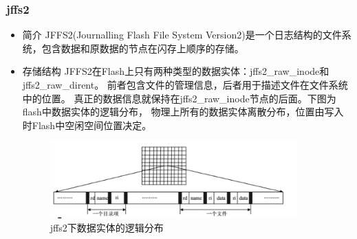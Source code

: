\documentclass[UTF8,a4paper]{ctexart}
\begin{document}
\subsubsection{jffs2}
\begin{itemize}
\item 简介
JFFS2(Journalling Flash File System Version2)是一个日志结构的文件系统，包含数据和原数据的节点在闪存上顺序的存储。
\item 存储结构
JFFS2在Flash上​​只有两种类型的数据实体：jffs2\_raw\_inode和jffs2\_raw\_dirent。
前者包含文件的管理信息，后者用于描述文件在文件系统中的位置。
真正的数据信息就保持在jffs2\_raw\_inode节点的后面。下图为flash中数据实体的逻辑分布，
物理上所有的数据实体离散分布，位置由写入时Flash中空闲空间位置决定。
	\begin{figure}[H]
		\centering
		\includegraphics[width=0.9\textwidth]{jffs2.png}
		\caption{jffs2下数据实体的逻辑分布}
	\end{figure}
\end{itemize}
\end{document}
